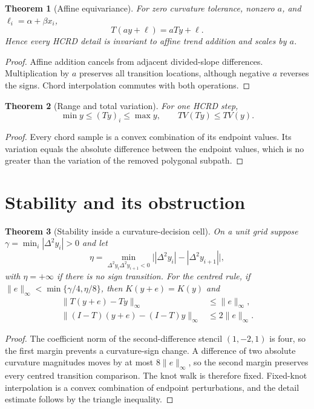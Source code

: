 \documentclass[review,onefignum,onetabnum]{siamonline250211}
\newtheorem{theorem}{Theorem}
\begin{document}
\begin{theorem}[Affine equivariance]
For zero curvature tolerance, nonzero $a$, and
$\ell_i=\alpha+\beta x_i$,
\begin{equation}
T(ay+\ell)=aTy+\ell.
\end{equation}
Hence every HCRD detail is invariant to affine trend addition and scales by
$a$.
\end{theorem}
\begin{proof}
Affine addition cancels from adjacent divided-slope differences.  Multiplication
by $a$ preserves all transition locations, although negative $a$ reverses the
signs.  Chord interpolation commutes with both operations.
\end{proof}

\begin{theorem}[Range and total variation]
For one HCRD step,
\begin{equation}
\min y\le (Ty)_i\le\max y,\qquad TV(Ty)\le TV(y).
\end{equation}
\end{theorem}
\begin{proof}
Every chord sample is a convex combination of its endpoint values.  Its
variation equals the absolute difference between the endpoint values, which is
no greater than the variation of the removed polygonal subpath.
\end{proof}

\section{Stability and its obstruction}
\begin{theorem}[Stability inside a curvature-decision cell]
\label{thm:local-stability}
On a unit grid suppose $\gamma=\min_i|\Delta^2y_i|>0$ and let
\begin{equation}
\eta=\min_{\Delta^2y_i\Delta^2y_{i+1}<0}
\bigl||\Delta^2y_i|-|\Delta^2y_{i+1}|\bigr|,
\end{equation}
with $\eta=+\infty$ if there is no sign transition.  For the centred rule, if
$\|e\|_\infty<\min\{\gamma/4,\eta/8\}$, then $K(y+e)=K(y)$ and
\begin{align}
\|T(y+e)-Ty\|_\infty &\le \|e\|_\infty,\\
\|(I-T)(y+e)-(I-T)y\|_\infty &\le 2\|e\|_\infty.
\end{align}
\end{theorem}
\begin{proof}
The coefficient norm of the second-difference stencil $(1,-2,1)$ is four, so
the first margin prevents a curvature-sign change.  A difference of two
absolute curvature magnitudes moves by at most $8\|e\|_\infty$, so the second
margin preserves every centred transition comparison.  The knot walk is
therefore fixed.  Fixed-knot interpolation is a convex combination of endpoint
perturbations, and the detail estimate follows by the triangle inequality.
\end{proof}
\end{document}
